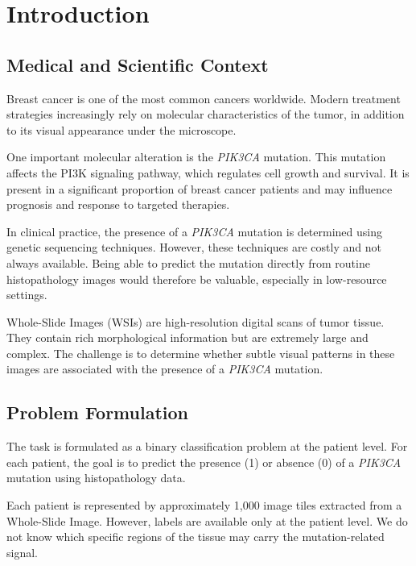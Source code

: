 \documentclass[11pt,a4paper]{article}
\begin{document}
\newpage
\tableofcontents
\newpage

\section{Introduction}
\label{sec:intro}

\subsection{Medical and Scientific Context}

Breast cancer is one of the most common cancers worldwide. 
Modern treatment strategies increasingly rely on molecular characteristics of the tumor, in addition to its visual appearance under the microscope.

One important molecular alteration is the \textit{PIK3CA} mutation. 
This mutation affects the PI3K signaling pathway, which regulates cell growth and survival. 
It is present in a significant proportion of breast cancer patients and may influence prognosis and response to targeted therapies.

In clinical practice, the presence of a \textit{PIK3CA} mutation is determined using genetic sequencing techniques. 
However, these techniques are costly and not always available. 
Being able to predict the mutation directly from routine histopathology images would therefore be valuable, especially in low-resource settings.

Whole-Slide Images (WSIs) are high-resolution digital scans of tumor tissue. 
They contain rich morphological information but are extremely large and complex. 
The challenge is to determine whether subtle visual patterns in these images are associated with the presence of a \textit{PIK3CA} mutation.

\subsection{Problem Formulation}

The task is formulated as a binary classification problem at the patient level. 
For each patient, the goal is to predict the presence (1) or absence (0) of a \textit{PIK3CA} mutation using histopathology data.

Each patient is represented by approximately 1,000 image tiles extracted from a Whole-Slide Image. 
However, labels are available only at the patient level. 
We do not know which specific regions of the tissue may carry the mutation-related signal.
\end{document}
